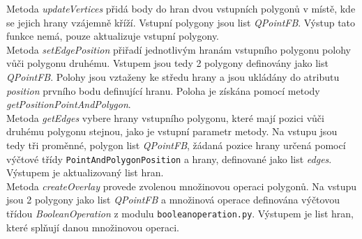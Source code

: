 \documentclass{article}
\begin{document}
Metoda \emph{updateVertices} přidá body do hran dvou vstupních polygonů v místě, kde se jejich hrany vzájemně kříží. Vstupní polygony jsou list \emph{QPointFB}. Výstup tato funkce nemá, pouze aktualizuje vstupní polygony.\\
Metoda \emph{setEdgePosition} přiřadí jednotlivým hranám vstupního polygonu polohy vůči polygonu druhému. Vstupem jsou tedy 2 polygony definovány jako list \emph{QPointFB}. Polohy jsou vztaženy ke středu hrany a jsou ukládány do atributu \emph{position} prvního bodu definující hranu. Poloha je získána pomocí metody \emph{getPositionPointAndPolygon}.\\
Metoda \emph{getEdges} vybere hrany vstupního polygonu, které mají pozici vůči druhému polygonu stejnou, jako je vstupní parametr metody. Na vstupu jsou tedy tři proměnné, polygon list \emph{QPointFB}, žádaná pozice hrany určená pomocí výčtové třídy \texttt{PointAndPolygonPosition} a hrany, definované jako list \emph{edges}. Výstupem je aktualizovaný list hran.\\
Metoda \emph{createOverlay} provede zvolenou množinovou operaci polygonů. Na vstupu jsou 2 polygony jako list \emph{QPointFB} a množinová operace definována výčtovou třídou \emph{BooleanOperation} z modulu \texttt{booleanoperation.py}. Výstupem je list hran, které splňují danou množinovou operaci.
\end{document}
